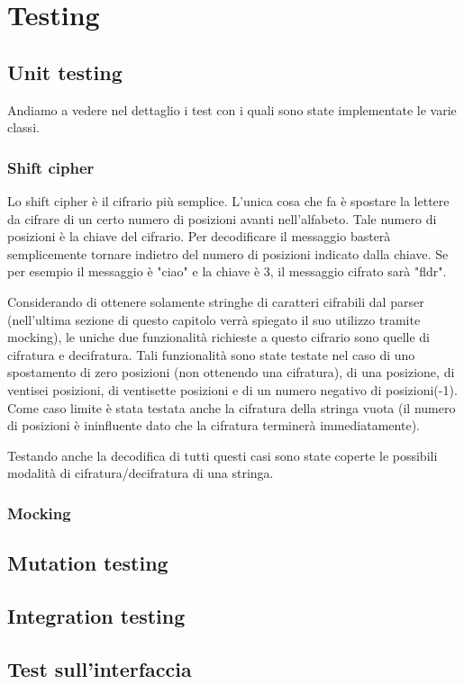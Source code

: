 \chapter{Testing}
	\section{Unit testing}
		Andiamo a vedere nel dettaglio i test con i quali sono state implementate le varie classi.
		\subsection{Shift cipher}
			Lo shift cipher è il cifrario più semplice. L'unica cosa che fa è spostare la lettere da cifrare di un certo numero di posizioni avanti nell'alfabeto. Tale numero di posizioni è la chiave del cifrario. Per decodificare il messaggio basterà semplicemente tornare indietro del numero di posizioni indicato dalla chiave. Se per esempio il messaggio è "ciao" e la chiave è 3, il messaggio cifrato sarà "fldr".
			
			Considerando di ottenere solamente stringhe di caratteri cifrabili dal parser (nell'ultima sezione di questo capitolo verrà spiegato il suo utilizzo tramite mocking), le uniche due funzionalità richieste a questo cifrario sono quelle di cifratura e decifratura. Tali funzionalità sono state testate nel caso di uno spostamento di zero posizioni (non ottenendo una cifratura), di una posizione, di ventisei posizioni, di ventisette posizioni e di un numero negativo di posizioni(-1). Come caso limite è stata testata anche la cifratura della stringa vuota (il numero di posizioni è ininfluente dato che la cifratura terminerà immediatamente).
			
			Testando anche la decodifica di tutti questi casi sono state coperte le possibili modalità di cifratura/decifratura di una stringa. 
		\subsection{Mocking}
	\section{Mutation testing}
	\section{Integration testing}
	\section{Test sull'interfaccia}